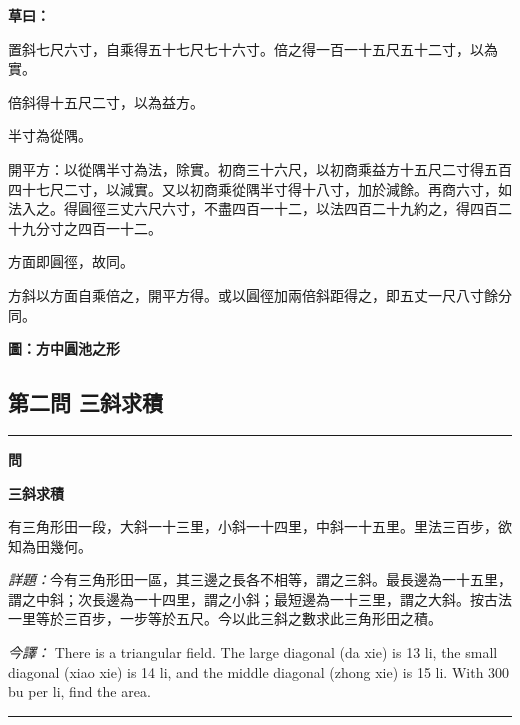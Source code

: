 \documentclass[11pt,a4paper]{article}
\newenvironment{problem}[1][]{%
  \medskip\noindent\rule{\textwidth}{0.4pt}%
  \par\noindent\textbf{\color{sectioncolor}#1}\par\nopagebreak%
  \smallskip%
}{%
  \par\noindent\rule{\textwidth}{0.4pt}\medskip%
}
\newenvironment{calculation}{%
  \medskip\noindent{\color{caocolor}\rule{0.4\textwidth}{0.4pt}}%
  \par\color{caocolor}%
}{%
  \par\medskip%
}
\begin{document}
\begin{calculation}
\textbf{草曰：}

置斜七尺六寸，自乘得五十七尺七十六寸。倍之得一百一十五尺五十二寸，以為實。

倍斜得十五尺二寸，以為益方。

半寸為從隅。

開平方：以從隅半寸為法，除實。初商三十六尺，以初商乘益方十五尺二寸得五百四十七尺二寸，以減實。又以初商乘從隅半寸得十八寸，加於減餘。再商六寸，如法入之。得圓徑三丈六尺六寸，不盡四百一十二，以法四百二十九約之，得四百二十九分寸之四百一十二。

方面即圓徑，故同。

方斜以方面自乘倍之，開平方得。或以圓徑加兩倍斜距得之，即五丈一尺八寸餘分同。
\end{calculation}

\noindent\textbf{圖：方中圓池之形}
\begin{center}
\end{center}

\subsection*{第二問 三斜求積}

\begin{problem}[\textbf{問}]
\textbf{\color{sectioncolor}三斜求積}

有三角形田一段，大斜一十三里，小斜一十四里，中斜一十五里。里法三百步，欲知為田幾何。

\medskip
\textit{詳題：}今有三角形田一區，其三邊之長各不相等，謂之三斜。最長邊為一十五里，謂之中斜；次長邊為一十四里，謂之小斜；最短邊為一十三里，謂之大斜。按古法一里等於三百步，一步等於五尺。今以此三斜之數求此三角形田之積。

\medskip
\textit{今譯：} There is a triangular field. The large diagonal (da xie) is 13 li, the small diagonal (xiao xie) is 14 li, and the middle diagonal (zhong xie) is 15 li. With 300 bu per li, find the area.
\end{problem}
\end{document}
